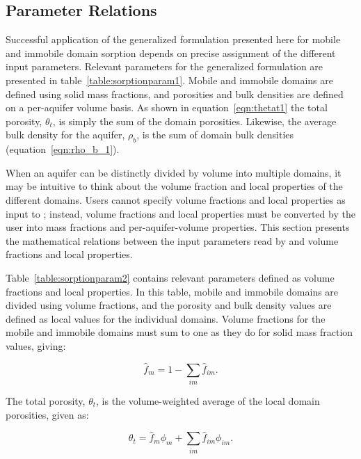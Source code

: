 \subsection{Parameter Relations} \label{sec:solidmassfrac3}

Successful application of the generalized formulation presented here for mobile and immobile domain sorption depends on precise assignment of the different input parameters.  Relevant parameters for the generalized formulation are presented in table~\ref{table:sorptionparam1}.  Mobile and immobile domains are defined using solid mass fractions, and porosities and bulk densities are defined on a per-aquifer volume basis.  As shown in equation~\ref{eqn:thetat1} the total porosity, $\theta_t$, is simply the sum of the domain porosities.  Likewise, the average bulk density for the aquifer, $\rho_b$, is the sum of domain bulk densities (equation~\ref{eqn:rho_b_1}).



When an aquifer can be distinctly divided by volume into multiple domains, it may be intuitive to think about the volume fraction and local properties of the different domains.  Users cannot specify volume fractions and local properties as input to \mf; instead, volume fractions and local properties must be converted by the user into mass fractions and per-aquifer-volume properties.  This section presents the mathematical relations between the input parameters read by \mf and volume fractions and local properties.



Table~\ref{table:sorptionparam2} contains relevant parameters defined as volume fractions and local properties.  In this table, mobile and immobile domains are divided using volume fractions, and the porosity and bulk density values are defined as local values for the individual domains.  Volume fractions for the mobile and immobile domains must sum to one as they do for solid mass fraction values, giving:

\begin{equation}
\label{eqn:fm5}
\hat{f}_m = 1 -  \sum_{im}{\hat{f}_{im}}.
\end{equation}

\noindent The total porosity, $\theta_t$, is the volume-weighted average of the local domain porosities, given as:

\begin{equation}
\label{eqn:thetat}
\theta_{t} =  \hat{f}_{m} \phi_{m} +  \sum_{im}{ \hat{f}_{im} \phi_{im}}.
\end{equation}

